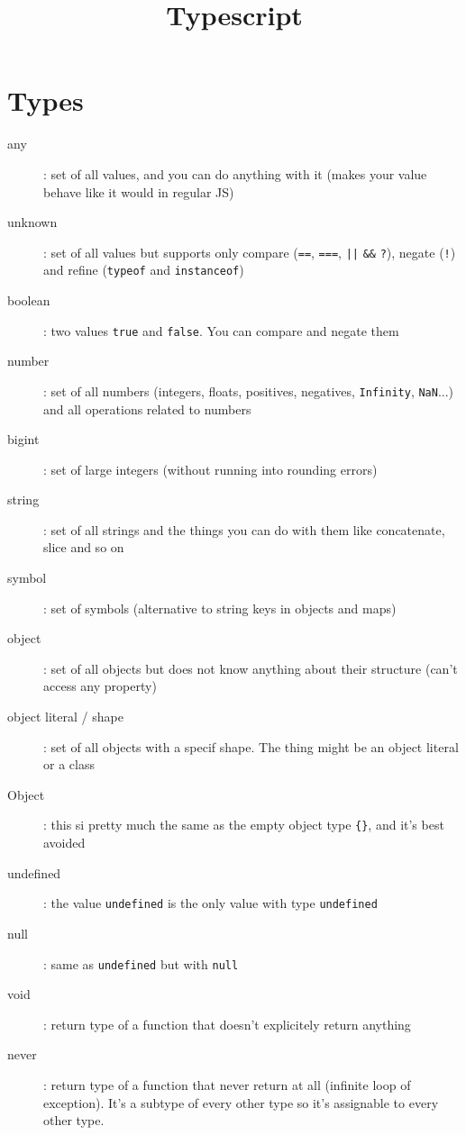 \documentclass[french]{article}
\title{Typescript}
\begin{document}
\date{}

\maketitle

\section{Types}

\begin{description}
  \item[any]: set of all values, and you can do anything with it (makes your value behave like it would in regular JS)
  \item[unknown]: set of all values but supports only compare (\lstinline{==}, \lstinline{===}, \lstinline{||} \lstinline{&&} \lstinline{?}), negate (\lstinline{!}) and refine (\lstinline{typeof} and \lstinline{instanceof})
  \item[boolean]: two values \lstinline{true} and \lstinline{false}. You can compare and negate them
  \item[number]: set of all numbers (integers, floats, positives, negatives, \lstinline{Infinity}, \lstinline{NaN}...) and all operations related to numbers
  \item[bigint]: set of large integers (without running into rounding errors)
  \item[string]: set of all strings and the things you can do with them like concatenate, slice and so on
  \item[symbol]: set of symbols (alternative to string keys in objects and maps)
  \item[object]: set of all objects but does not know anything about their structure (can't access any property)
  \item[object literal / shape]: set of all objects with a specif shape. The thing might be an object literal or a class
  \item[Object]: this si pretty much the same as the empty object type \lstinline|{}|, and it's best avoided
  \item[undefined]: the value \lstinline{undefined} is the only value with type \lstinline{undefined}
  \item[null]: same as \lstinline{undefined} but with \lstinline{null}
  \item[void]: return type of a function that doesn't explicitely return anything
  \item[never]: return type of a function that never return at all (infinite loop of exception). It's a subtype of every other type so it's assignable to every other type.
\end{description}
\end{document}
